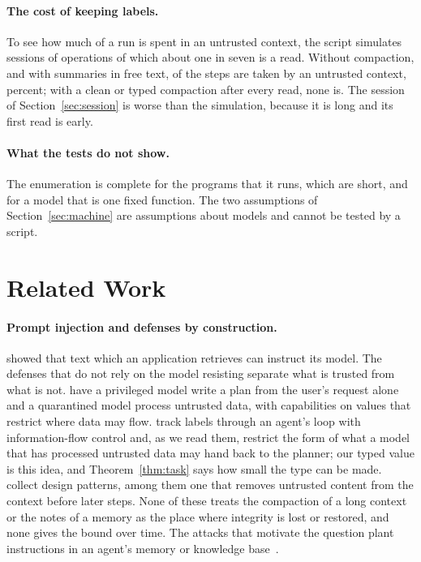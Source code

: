 \documentclass[acmsmall,nonacm,screen]{acmart}
\newcommand{\claim}[2]{#2}
\begin{document}
\paragraph{The cost of keeping labels.} To see how much of a run is spent in an untrusted
context, the script simulates \exCostSessions{} sessions of \exCostLength{} operations of
which about one in seven is a read. \claim{cost}{Without compaction, and with summaries in
free text, \exCostChosen{} of the \exCostSteps{} steps are taken by an untrusted context,
\exCostShare{} percent; with a clean or typed compaction after every read, none is.} The
session of Section~\ref{sec:session} is worse than the simulation, because it is long and
its first read is early.

\paragraph{What the tests do not show.} The enumeration is complete for the programs that it
runs, which are short, and for a model that is one fixed function. The two assumptions of
Section~\ref{sec:machine} are assumptions about models and cannot be tested by a script.

\section{Related Work}
\label{sec:related}

\paragraph{Prompt injection and defenses by construction.} \citet{greshake2023} showed that
text which an application retrieves can instruct its model. The defenses that do not rely on
the model resisting separate what is trusted from what is not. \citet{debenedetti2025} have
a privileged model write a plan from the user's request alone and a quarantined model
process untrusted data, with capabilities on values that restrict where data may flow.
\citet{costa2025} track labels through an agent's loop with information-flow control and, as
we read them, restrict the form of what a model that has processed untrusted data may hand
back to the planner; our typed value is this idea, and Theorem~\ref{thm:task} says how small
the type can be made. \citet{beurer2025} collect design patterns, among them one
that removes untrusted content from the context before later steps. None of these treats the
compaction of a long context or the notes of a memory as the place where integrity is lost
or restored, and none gives the bound over time. The attacks that motivate the question
plant instructions in an agent's memory or knowledge base~\cite{chen2024,dong2025}.
\end{document}
